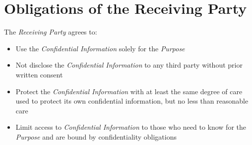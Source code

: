 
\section{Obligations of the Receiving Party}
\label{sec:obligations}

The \textit{Receiving Party} agrees to:
\begin{itemize}
  \item Use the \textit{Confidential Information} solely for the \textit{Purpose}
  \item Not disclose the \textit{Confidential Information} to any third party without prior written consent
  \item Protect the \textit{Confidential Information} with at least the same degree of care used to protect its own confidential information, but no less than reasonable care
  \item Limit access to \textit{Confidential Information} to those who need to know for the \textit{Purpose} and are bound by confidentiality obligations
\end{itemize}

